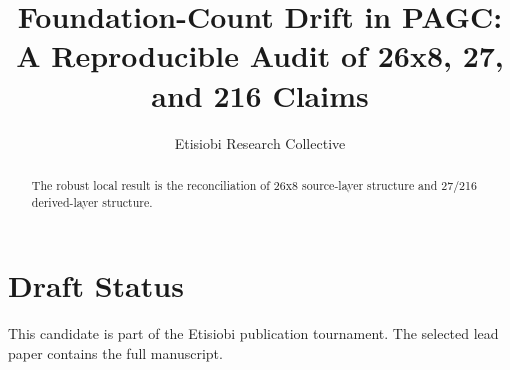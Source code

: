 \documentclass[manuscript]{acmart}
\title{Foundation-Count Drift in PAGC: A Reproducible Audit of 26x8, 27, and 216 Claims}
\author{Etisiobi Research Collective}
\affiliation{\institution{The Beaconsmith Collective}\country{Nigeria}}
\begin{document}
\begin{abstract}
The robust local result is the reconciliation of 26x8 source-layer structure and 27/216 derived-layer structure.
\end{abstract}
\maketitle
\section{Draft Status}
This candidate is part of the Etisiobi publication tournament. The selected lead paper contains the full manuscript.


\end{document}
